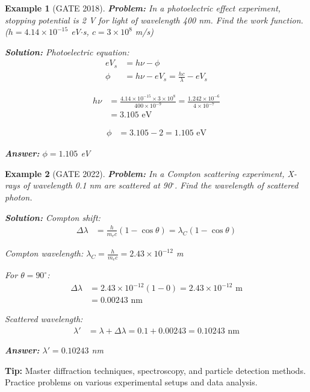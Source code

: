 \documentclass[12pt,a4paper]{article}
\newtheorem{example}{Example}[section]
\newcommand{\ans}[1]{\textcolor{red!70!black}{\textbf{Answer:} #1}}
\newcommand{\sol}{\textcolor{blue!70!black}{\textbf{Solution:}}}
\newcommand{\tip}[1]{\textcolor{green!60!black}{\textbf{Tip:} #1}}
\begin{document}
\begin{example}[GATE 2018]
\textbf{Problem:} In a photoelectric effect experiment, stopping potential is 2 V for light of wavelength 400 nm. Find the work function. ($h = 4.14 \times 10^{-15}$ eV$\cdot$s, $c = 3 \times 10^8$ m/s)

\sol
Photoelectric equation:
\begin{align}
eV_s &= h\nu - \phi\\
\phi &= h\nu - eV_s = \frac{hc}{\lambda} - eV_s
\end{align}

\begin{align}
h\nu &= \frac{4.14 \times 10^{-15} \times 3 \times 10^8}{400 \times 10^{-9}} = \frac{1.242 \times 10^{-6}}{4 \times 10^{-7}}\\
&= 3.105 \text{ eV}
\end{align}

\begin{align}
\phi &= 3.105 - 2 = 1.105 \text{ eV}
\end{align}

\ans{$\phi = 1.105$ eV}
\end{example}

\begin{example}[GATE 2022]
\textbf{Problem:} In a Compton scattering experiment, X-rays of wavelength 0.1 nm are scattered at 90$^\circ$. Find the wavelength of scattered photon.

\sol
Compton shift:
\begin{align}
\Delta\lambda &= \frac{h}{m_e c}(1 - \cos\theta) = \lambda_C(1 - \cos\theta)
\end{align}

Compton wavelength: $\lambda_C = \frac{h}{m_e c} = 2.43 \times 10^{-12}$ m

For $\theta = 90^\circ$:
\begin{align}
\Delta\lambda &= 2.43 \times 10^{-12}(1 - 0) = 2.43 \times 10^{-12} \text{ m}\\
&= 0.00243 \text{ nm}
\end{align}

Scattered wavelength:
\begin{align}
\lambda' &= \lambda + \Delta\lambda = 0.1 + 0.00243 = 0.10243 \text{ nm}
\end{align}

\ans{$\lambda' = 0.10243$ nm}
\end{example}

\tip{Master diffraction techniques, spectroscopy, and particle detection methods. Practice problems on various experimental setups and data analysis.}
\end{document}
